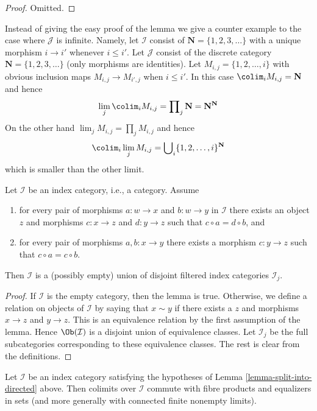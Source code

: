 \begin{proof}
Omitted.
\end{proof}

\noindent
Instead of giving the easy proof of the lemma we give a counter example to
the case where $\mathcal{J}$ is infinite. Namely, let
$\mathcal{I}$ consist of $\mathbf{N} = \{1, 2, 3, \ldots\}$
with a unique morphism $i \to i'$ whenever $i \leq i'$.
Let $\mathcal{J}$ consist of the discrete category
$\mathbf{N} = \{1, 2, 3, \ldots\}$ (only morphisms are identities).
Let $M_{i, j} = \{1, 2, \ldots, i\}$ with obvious inclusion maps
$M_{i, j} \to M_{i', j}$ when $i \leq i'$. In this case
$\colim_i M_{i, j} = \mathbf{N}$ and hence
$$
\lim_j \colim_i M_{i, j}
=
\prod\nolimits_j \mathbf{N}
=
\mathbf{N}^\mathbf{N}
$$
On the other hand $\lim_j M_{i, j} = \prod\nolimits_j M_{i, j}$ and
hence
$$
\colim_i \lim_j M_{i, j}
=
\bigcup\nolimits_i \{1, 2, \ldots, i\}^{\mathbf{N}}
$$
which is smaller than the other limit.

\begin{lemma}
\label{lemma-split-into-directed}
Let $\mathcal{I}$ be an index category, i.e., a category.
Assume
\begin{enumerate}
\item for every pair of morphisms $a : w \to x$ and $b : w \to y$
in $\mathcal{I}$ there exists an object $z$ and morphisms $c : x \to z$
and $d : y \to z$ such that $c \circ a = d \circ b$, and
\item for every pair of morphisms $a, b : x \to y$ there exists
a morphism $c : y \to z$ such that $c \circ a = c \circ b$.
\end{enumerate}
Then $\mathcal{I}$ is a (possibly empty) union
of disjoint filtered index categories $\mathcal{I}_j$.
\end{lemma}

\begin{proof}
If $\mathcal{I}$ is the empty category, then the lemma is true.
Otherwise, we define a relation on objects of $\mathcal{I}$ by
saying that $x \sim y$ if there exists a $z$ and
morphisms $x \to z$ and $y \to z$. This is an equivalence
relation by the first assumption of the lemma. Hence $\Ob(\mathcal{I})$
is a disjoint union of equivalence classes. Let $\mathcal{I}_j$
be the full subcategories corresponding to these equivalence classes.
The rest is clear from the definitions.
\end{proof}

\begin{lemma}
\label{lemma-almost-directed-commutes-equalizers}
Let $\mathcal{I}$ be an index category satisfying the hypotheses of
Lemma \ref{lemma-split-into-directed} above. Then colimits over $\mathcal{I}$
commute with fibre products and equalizers in sets (and more generally
with connected finite nonempty limits).
\end{lemma}

